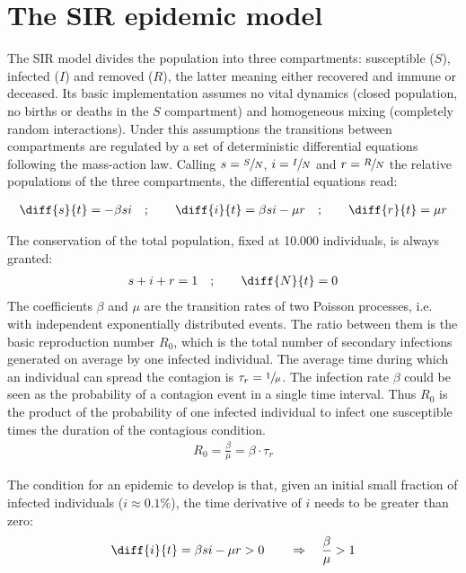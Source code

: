 \documentclass[DIV=12, BCOR=0pt]{scrartcl}  %
\begin{document}
  
  
  
  \section{The SIR epidemic model}
  The SIR model divides the population into three compartments: susceptible ($S$), infected ($I$) and removed ($R$), the latter meaning either recovered and immune or deceased. Its basic implementation assumes no vital dynamics (closed population, no births or deaths in the $S$ compartment) and homogeneous mixing (completely random interactions). Under this assumptions the transitions between compartments are regulated by a set of deterministic differential equations following the mass-action law. Calling $s = \sfrac{S}{N}$, $i = \sfrac{I}{N}$ and $r = \sfrac{R}{N}$ the relative populations of the three compartments, the differential equations read:
  
  \begin{align}
  	\diff{s}{t} = - \beta s i \quad;  \qquad 	\diff{i}{t} = \beta s i - \mu r \quad; \qquad  \diff{r}{t} = \mu r
  \end{align}
  
  The conservation of the total population, fixed at 10.000 individuals, is always granted: %
  \begin{align}
  	s + i + r = 1 \quad ; \qquad \diff{N}{t}= 0
  \end{align}
  The coefficients $\beta$ and $\mu$ are the transition rates of two Poisson processes, i.e. with independent exponentially distributed events. The ratio between them is the basic reproduction number $R_{0}$, which is the total number of secondary infections generated on average by one infected individual.   
  The average time during which an individual can spread the contagion is $\tau_{r} = \sfrac{1}{\mu}$. The infection rate $\beta$ could be seen as the probability of a contagion event in a single time interval. Thus $R_{0}$ is the product of the probability of one infected individual to infect one susceptible times the duration of the contagious condition.
  \begin{align}
			R_{0} = \frac{\beta}{\mu} = \beta \cdot \tau_{r}
  \end{align}
  
  The condition for an epidemic to develop is that, given an initial small fraction of infected individuals ($i \approx 0.1 \%$), the time derivative of $i$ needs to be greater than zero:
  \begin{align}
  	\diff{i}{t} = \beta s i - \mu r > 0 \qquad \Rightarrow \quad 	\frac{\beta}{\mu} > 1  %
  \end{align}
  
\end{document}
